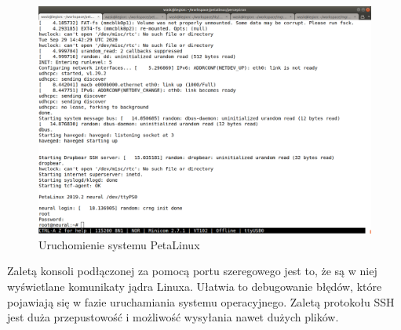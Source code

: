 \begin{figure}[!h]
  \centering
  \includegraphics[width=\textwidth]{img/petalinux-boot.png}
  \caption{Uruchomienie systemu PetaLinux}
  \label{petalinux-boot}
\end{figure}

Zaletą konsoli podłączonej za pomocą portu szeregowego jest to, że są w niej wyświetlane komunikaty jądra Linuxa. Ułatwia to debugowanie błędów, które pojawiają się w fazie uruchamiania systemu operacyjnego. Zaletą protokołu SSH jest duża przepustowość i możliwość wysyłania nawet dużych plików.


